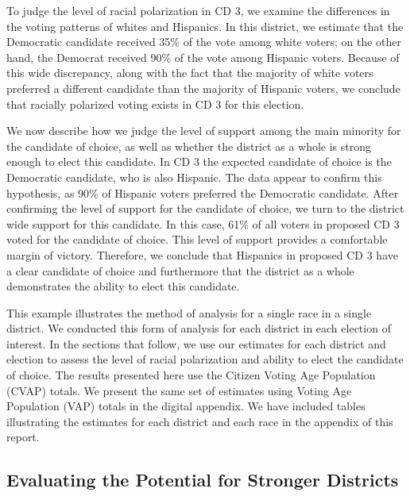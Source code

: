 \documentclass[12pt]{article}
\begin{document}

To judge the level of racial polarization in CD 3, we examine the
differences in the voting patterns of whites and Hispanics. In this
district, we estimate that the Democratic candidate received 35\% of
the vote among white voters; on the other hand, the Democrat received
90\% of the vote among Hispanic voters. Because of this wide
discrepancy, along with the fact that the majority of white voters
preferred a different candidate than the majority of Hispanic voters,
we conclude that racially polarized voting exists in CD 3 for this
election.

We now describe how we judge the level of support among the main
minority for the candidate of choice, as well as whether the district
as a whole is strong enough to elect this candidate. In CD 3 the
expected candidate of choice is the Democratic candidate, who is also
Hispanic. The data appear to confirm this hypothesis, as 90\% of
Hispanic voters preferred the Democratic candidate. After confirming
the level of support for the candidate of choice, we turn to the
district wide support for this candidate. In this case, 61\% of all
voters in proposed CD 3 voted for the candidate of choice. This level
of support provides a comfortable margin of victory. Therefore, we
conclude that Hispanics in proposed CD 3 have a clear candidate of
choice and furthermore that the district as a whole demonstrates the
ability to elect this candidate.

This example illustrates the method of analysis for a single race in a
single district. We conducted this form of analysis for each district
in each election of interest. In the sections that follow, we use our
estimates for each district and election to assess the level of racial
polarization and ability to elect the candidate of choice.  The
results presented here use the Citizen Voting Age Population (CVAP)
totals. We present the same set of estimates using Voting Age
Population (VAP) totals in the digital appendix.  We have included
tables illustrating the estimates for each district and each race in
the appendix of this report.

\subsection{Evaluating the Potential for Stronger Districts}
\end{document}
